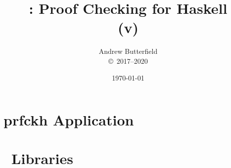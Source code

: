\documentclass[fleqn,10pt]{report}
\author{
Andrew Butterfield
\\
{\small \copyright\ 2017--2020}
}
\title{
  \prfchk: Proof Checking for Haskell
  \\(v\version)
}
\date{
\today
}
\begin{document}
\maketitle
\tableofcontents

\chapter{prfckh Application}




\chapter{\prfchk\ Libraries}


\newpage

\newpage

\newpage

\newpage


\appendix

\end{document}
